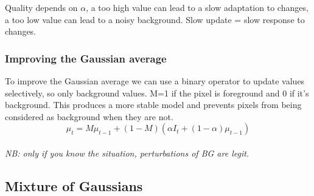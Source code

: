 Quality depends on $\alpha$, a too high value can lead to a slow adaptation to changes, a too low value can lead to a noisy background. Slow update = slow response to changes.
\subsubsection{Improving the Gaussian average}
To improve the Gaussian average we can use a binary operator to update values selectively, so only background values. M=1 if the pixel is foreground and 0 if it's background. This produces a more stable model and prevents pixels from being considered as background when they are not.
\[
    \mu_{t} = M\mu_{t-1} + (1-M)(\alpha I_t + (1-\alpha)\mu_{t-1})
\]
\\\textit{NB: only if you know the situation, perturbations of BG are legit.}
\subsection{Mixture of Gaussians}

